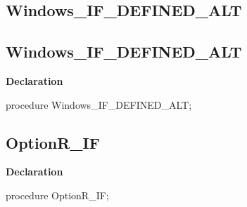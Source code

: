 \documentclass{report}
\newif\ifpdf
\begin{document}
\subsection*{\large{\textbf{Windows{\_}IF{\_}DEFINED{\_}ALT}}\normalsize\hspace{1ex}\hrulefill}
\else
\subsection*{Windows{\_}IF{\_}DEFINED{\_}ALT}
\fi
\label{ok_if_expressions-Windows_IF_DEFINED_ALT}
\begin{list}{}{
\setlength{\itemindent}{0cm}
\setlength{\listparindent}{0cm}
\setlength{\leftmargin}{\evensidemargin}
\addtolength{\leftmargin}{\tmplength}
\settowidth{\labelsep}{X}
\addtolength{\leftmargin}{\labelsep}
\setlength{\labelwidth}{\tmplength}
}
\item[\textbf{Declaration}\hfill]
\ifpdf
\begin{flushleft}
\fi
\begin{ttfamily}
procedure Windows{\_}IF{\_}DEFINED{\_}ALT;\end{ttfamily}

\ifpdf
\end{flushleft}
\fi

\end{list}
\ifpdf
\subsection*{\large{\textbf{OptionR{\_}IF}}\normalsize\hspace{1ex}\hrulefill}
\else
\subsection*{OptionR{\_}IF}
\fi
\label{ok_if_expressions-OptionR_IF}
\begin{list}{}{
\setlength{\itemindent}{0cm}
\setlength{\listparindent}{0cm}
\setlength{\leftmargin}{\evensidemargin}
\addtolength{\leftmargin}{\tmplength}
\settowidth{\labelsep}{X}
\addtolength{\leftmargin}{\labelsep}
\setlength{\labelwidth}{\tmplength}
}
\item[\textbf{Declaration}\hfill]
\ifpdf
\begin{flushleft}
\fi
\begin{ttfamily}
procedure OptionR{\_}IF;\end{ttfamily}

\ifpdf
\end{flushleft}
\fi

\end{list}
\ifpdf
\end{document}
